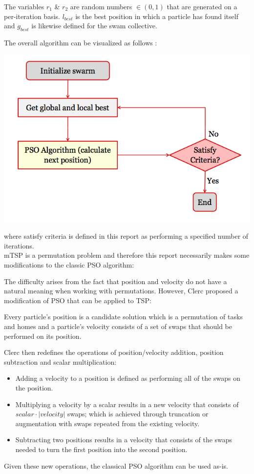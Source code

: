 \documentclass[a4paper]{article}
\begin{document}
The variables $r_1$ \& $r_2$ are random numbers $\in (0,1)$ that are generated on a per-iteration basis. $l_\mathit{best}$ is the best position in which a particle has found itself and $g_\mathit{best}$ is likewise defined for the swam collective.

The overall algorithm can be visualized as follows \cite{PSOFigure}:

\includegraphics[width=1\textwidth]{images/PSO.png}

where satisfy criteria is defined in this report as performing a specified number of iterations.\\

mTSP is a permutation problem and therefore this report necessarily makes some modifications to the classic PSO algorithm:

The difficulty arises from the fact that position and velocity do not have a natural meaning when working
with permutations. However, Clerc\cite{PermutationPSO} proposed a modification of PSO that can be applied to TSP:

Every particle's position is a candidate solution which is a permutation of tasks and homes and
a particle's velocity consists of a set of swaps that should be performed on its position.

Clerc then redefines the operations of position/velocity addition, position subtraction and scalar multiplication: 
\begin{itemize}
\item Adding a velocity to a position is defined as performing all of the swaps on the position.
\item Multiplying a velocity by a scalar results in a new velocity that consists of $scalar\cdot |velocity|$ swaps; which is achieved through truncation or augmentation with swaps repeated from the existing velocity.
\item Subtracting two positions results in a velocity that consists of the swaps needed to turn the first position into the second position.
\end{itemize}
Given these new operations, the classical PSO algorithm can be used as-is.
\end{document}
